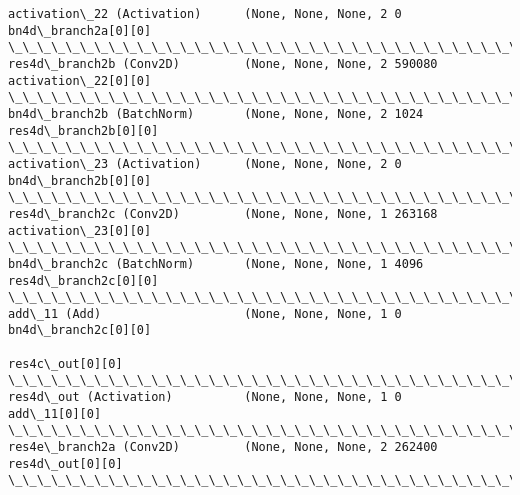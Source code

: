 \documentclass[11pt]{article}
\begin{document}
\begin{Verbatim}[commandchars=\\\{\}]
activation\_22 (Activation)      (None, None, None, 2 0           bn4d\_branch2a[0][0]              
\_\_\_\_\_\_\_\_\_\_\_\_\_\_\_\_\_\_\_\_\_\_\_\_\_\_\_\_\_\_\_\_\_\_\_\_\_\_\_\_\_\_\_\_\_\_\_\_\_\_\_\_\_\_\_\_\_\_\_\_\_\_\_\_\_\_\_\_\_\_\_\_\_\_\_\_\_\_\_\_\_\_\_\_\_\_\_\_\_\_\_\_\_\_\_\_\_\_
res4d\_branch2b (Conv2D)         (None, None, None, 2 590080      activation\_22[0][0]              
\_\_\_\_\_\_\_\_\_\_\_\_\_\_\_\_\_\_\_\_\_\_\_\_\_\_\_\_\_\_\_\_\_\_\_\_\_\_\_\_\_\_\_\_\_\_\_\_\_\_\_\_\_\_\_\_\_\_\_\_\_\_\_\_\_\_\_\_\_\_\_\_\_\_\_\_\_\_\_\_\_\_\_\_\_\_\_\_\_\_\_\_\_\_\_\_\_\_
bn4d\_branch2b (BatchNorm)       (None, None, None, 2 1024        res4d\_branch2b[0][0]             
\_\_\_\_\_\_\_\_\_\_\_\_\_\_\_\_\_\_\_\_\_\_\_\_\_\_\_\_\_\_\_\_\_\_\_\_\_\_\_\_\_\_\_\_\_\_\_\_\_\_\_\_\_\_\_\_\_\_\_\_\_\_\_\_\_\_\_\_\_\_\_\_\_\_\_\_\_\_\_\_\_\_\_\_\_\_\_\_\_\_\_\_\_\_\_\_\_\_
activation\_23 (Activation)      (None, None, None, 2 0           bn4d\_branch2b[0][0]              
\_\_\_\_\_\_\_\_\_\_\_\_\_\_\_\_\_\_\_\_\_\_\_\_\_\_\_\_\_\_\_\_\_\_\_\_\_\_\_\_\_\_\_\_\_\_\_\_\_\_\_\_\_\_\_\_\_\_\_\_\_\_\_\_\_\_\_\_\_\_\_\_\_\_\_\_\_\_\_\_\_\_\_\_\_\_\_\_\_\_\_\_\_\_\_\_\_\_
res4d\_branch2c (Conv2D)         (None, None, None, 1 263168      activation\_23[0][0]              
\_\_\_\_\_\_\_\_\_\_\_\_\_\_\_\_\_\_\_\_\_\_\_\_\_\_\_\_\_\_\_\_\_\_\_\_\_\_\_\_\_\_\_\_\_\_\_\_\_\_\_\_\_\_\_\_\_\_\_\_\_\_\_\_\_\_\_\_\_\_\_\_\_\_\_\_\_\_\_\_\_\_\_\_\_\_\_\_\_\_\_\_\_\_\_\_\_\_
bn4d\_branch2c (BatchNorm)       (None, None, None, 1 4096        res4d\_branch2c[0][0]             
\_\_\_\_\_\_\_\_\_\_\_\_\_\_\_\_\_\_\_\_\_\_\_\_\_\_\_\_\_\_\_\_\_\_\_\_\_\_\_\_\_\_\_\_\_\_\_\_\_\_\_\_\_\_\_\_\_\_\_\_\_\_\_\_\_\_\_\_\_\_\_\_\_\_\_\_\_\_\_\_\_\_\_\_\_\_\_\_\_\_\_\_\_\_\_\_\_\_
add\_11 (Add)                    (None, None, None, 1 0           bn4d\_branch2c[0][0]              
                                                                 res4c\_out[0][0]                  
\_\_\_\_\_\_\_\_\_\_\_\_\_\_\_\_\_\_\_\_\_\_\_\_\_\_\_\_\_\_\_\_\_\_\_\_\_\_\_\_\_\_\_\_\_\_\_\_\_\_\_\_\_\_\_\_\_\_\_\_\_\_\_\_\_\_\_\_\_\_\_\_\_\_\_\_\_\_\_\_\_\_\_\_\_\_\_\_\_\_\_\_\_\_\_\_\_\_
res4d\_out (Activation)          (None, None, None, 1 0           add\_11[0][0]                     
\_\_\_\_\_\_\_\_\_\_\_\_\_\_\_\_\_\_\_\_\_\_\_\_\_\_\_\_\_\_\_\_\_\_\_\_\_\_\_\_\_\_\_\_\_\_\_\_\_\_\_\_\_\_\_\_\_\_\_\_\_\_\_\_\_\_\_\_\_\_\_\_\_\_\_\_\_\_\_\_\_\_\_\_\_\_\_\_\_\_\_\_\_\_\_\_\_\_
res4e\_branch2a (Conv2D)         (None, None, None, 2 262400      res4d\_out[0][0]                  
\_\_\_\_\_\_\_\_\_\_\_\_\_\_\_\_\_\_\_\_\_\_\_\_\_\_\_\_\_\_\_\_\_\_\_\_\_\_\_\_\_\_\_\_\_\_\_\_\_\_\_\_\_\_\_\_\_\_\_\_\_\_\_\_\_\_\_\_\_\_\_\_\_\_\_\_\_\_\_\_\_\_\_\_\_\_\_\_\_\_\_\_\_\_\_\_\_\_

\end{Verbatim}
\end{document}
